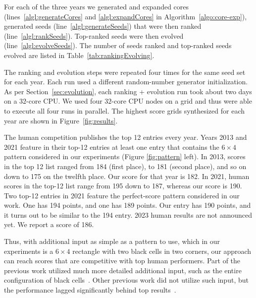 For each of the three years we generated and expanded cores (lines~\ref{algl:generateCores} and \ref{algl:expandCores} in Algorithm~\ref{algo:core-exp}), generated seeds (line~\ref{algl:generateSeeds}) that were then ranked (line~\ref{algl:rankSeeds}). Top-ranked seeds were then evolved (line~\ref{algl:evolveSeeds}). The number of seeds ranked and top-ranked seeds evolved are listed in Table~\ref{tab:rankingEvolving}.


The ranking and evolution steps were repeated four times for the same seed set for each year. Each run used a different random-number generator initialization. As per Section~\ref{sec:evolution}, each ranking + evolution run took about two days on a $32$-core CPU. We used four $32$-core CPU nodes on a grid and thus were able to execute all four runs in parallel. The highest score grids synthesized for each year are shown in Figure~\ref{fig:results}. 

The human competition publishes the top 12 entries every year.
Years 2013 and 2021 feature in their top-12 entries at least one entry that contains the $6 \times 4$ pattern
considered in our experiments (Figure \ref{fig:pattern} left).
In 2013, scores in the top 12 list ranged from 184 (first place), to 181 (second place), and so on down to 175 on the twelfth place.
Our score for that year is 182.
In 2021, human scores in the top-12 list range from 195 down to 187, whereas our score is 190.
Two top-12 entries in 2021 feature the perfect-score pattern considered in our work.
One has 194 points, and one has 189 points. Our entry has 190 points, and it turns out to be similar to the 194 entry. 
2023 human results are not announced yet. We report a score of 186.

Thus, with additional input as simple as a pattern to use, which 
in our experiments
is a $6 \times 4$ rectangle with two black cells in two corners,
our approach can reach scores that are competitive with top human performers.
Part of the previous work utilized much more detailed additional input, such as the entire configuration of black cells~\cite{DBLP:conf/socs/BoteaB21}.
Other previous work did not utilize such input, but the performance lagged significantly behind
top results~\cite{DBLP:conf/cig/BulitkoB21}.




